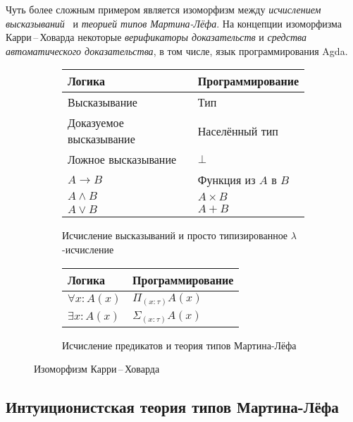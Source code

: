 Чуть более сложным примером является изоморфизм между
\emph{исчислением высказываний}~\cite{шень2,curryhoward} и
\emph{теорией типов Мартина-Лёфа}. На концепции изоморфизма
Карри\,--\,Ховарда некоторые \emph{верификаторы доказательств} и
\emph{средства автоматического доказательства}, в том числе, язык
программирования Agda.

\begin{figure}
  \centering
  \begin{subfigure}[b]{0.55\textwidth}
    \centering
    \begin{tabular}{|l|l|}
      \hline
      \textbf{Логика} & \textbf{Программирование} \\
      \hline
      Высказывание & Тип \\
      \hline
      Доказуемое высказывание & Населённый тип \\
      \hline
      Ложное высказывание & $\bot$ \\
      \hline
      $A \to B$ & Функция из $A$ в $B$ \\
      \hline
      $A \wedge B$ & $A \times B$ \\
      \hline
      $A \vee B$ & $A + B$ \\
      \hline
    \end{tabular}
    \caption{Исчисление высказываний и просто типизированное
      $\lambda$-исчисление}
    \label{fig:curry-howard-int}
  \end{subfigure}
  \begin{subfigure}[b]{0.4\textwidth}
    \centering
    \begin{tabular}{|l|l|}
      \hline
      \textbf{Логика} & \textbf{Программирование} \\
      \hline
      $\forall x : A(x)$ & $\Pi_{(x:\tau)} A(x)$ \\
      \hline
      $\exists x : A(x)$ & $\Sigma_{(x:\tau)} A(x)$\\
      \hline
    \end{tabular}
    \caption{Исчисление предикатов и теория типов Мартина-Лёфа}
    \label{fig:curry-howard-mltt}
  \end{subfigure}
  \caption{Изоморфизм Карри\,--\,Ховарда}
\end{figure}

\subsection{Интуиционистская теория типов Мартина-Лёфа}

